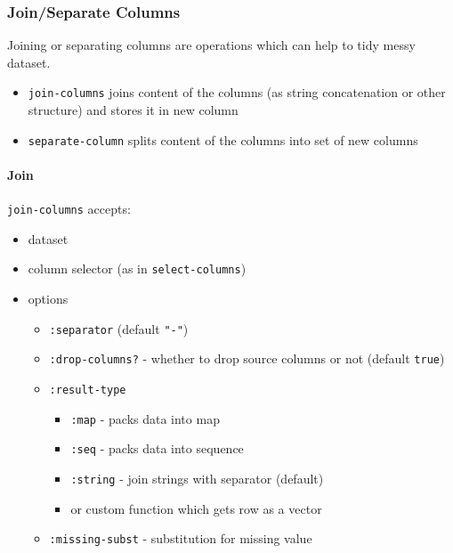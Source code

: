 \documentclass[]{article}
\providecommand{\tightlist}{%
  \setlength{\itemsep}{0pt}\setlength{\parskip}{0pt}}
\let\oldparagraph\paragraph
\renewcommand{\paragraph}[1]{\oldparagraph{#1}\mbox{}}
\begin{document}
\subsubsection{Join/Separate Columns}\label{joinseparate-columns}

Joining or separating columns are operations which can help to tidy
messy dataset.

\begin{itemize}
\tightlist
\item
  \texttt{join-columns} joins content of the columns (as string
  concatenation or other structure) and stores it in new column
\item
  \texttt{separate-column} splits content of the columns into set of new
  columns
\end{itemize}

\paragraph{Join}\label{join}

\texttt{join-columns} accepts:

\begin{itemize}
\tightlist
\item
  dataset
\item
  column selector (as in \texttt{select-columns})
\item
  options

  \begin{itemize}
  \tightlist
  \item
    \texttt{:separator} (default \texttt{"-"})
  \item
    \texttt{:drop-columns?} - whether to drop source columns or not
    (default \texttt{true})
  \item
    \texttt{:result-type}

    \begin{itemize}
    \tightlist
    \item
      \texttt{:map} - packs data into map
    \item
      \texttt{:seq} - packs data into sequence
    \item
      \texttt{:string} - join strings with separator (default)
    \item
      or custom function which gets row as a vector
    \end{itemize}
  \item
    \texttt{:missing-subst} - substitution for missing value
  \end{itemize}
\end{itemize}
\end{document}

